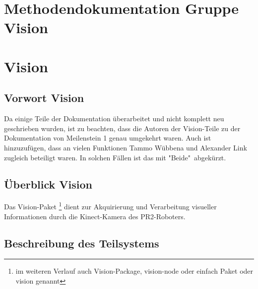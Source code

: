 \documentclass{suturo}
\begin{document}

\newpage

\section*{Methodendokumentation Gruppe Vision}

\section{Vision}
\subsection{Vorwort Vision}
Da einige Teile der Dokumentation überarbeitet und nicht komplett neu geschrieben wurden, ist zu beachten, dass die Autoren der Vision-Teile zu der Dokumentation von Meilenstein 1 genau umgekehrt waren. Auch ist hinzuzufügen, dass an vielen Funktionen Tammo Wübbena und Alexander Link zugleich beteiligt waren. In solchen Fällen ist das mit "Beide"\ abgekürzt.

\subsection{Überblick Vision}
Das Vision-Paket \footnote{im weiteren Verlauf auch Vision-Package, vision-node oder einfach Paket oder vision genannt} dient zur Akquirierung und Verarbeitung visueller Informationen durch die Kinect-Kamera des PR2-Roboters.

\begin{figure}[!htb]
\end{figure}
      
\subsection{Beschreibung des Teilsystems}
\end{document}
